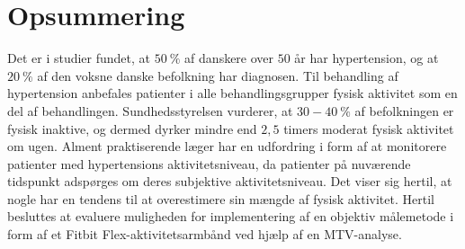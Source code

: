 \section{Opsummering}
Det er i studier fundet, at $50~\%$ af danskere over $50$ år har hypertension, og at $20~\%$ af den voksne danske befolkning har diagnosen. Til behandling af hypertension anbefales patienter i alle behandlingsgrupper fysisk aktivitet som en del af behandlingen. Sundhedsstyrelsen vurderer, at $30-40~\%$ af befolkningen er fysisk inaktive, og dermed dyrker mindre end $2,5$ timers moderat fysisk aktivitet om ugen. Alment praktiserende læger har en udfordring i form af at monitorere patienter med hypertensions aktivitetsniveau, da patienter på nuværende tidspunkt adspørges om deres subjektive aktivitetsniveau. Det viser sig hertil, at nogle har en tendens til at overestimere sin mængde af fysisk aktivitet. Hertil besluttes at evaluere muligheden for implementering af en objektiv målemetode i form af et Fitbit Flex-aktivitetsarmbånd ved hjælp af en MTV-analyse. 
